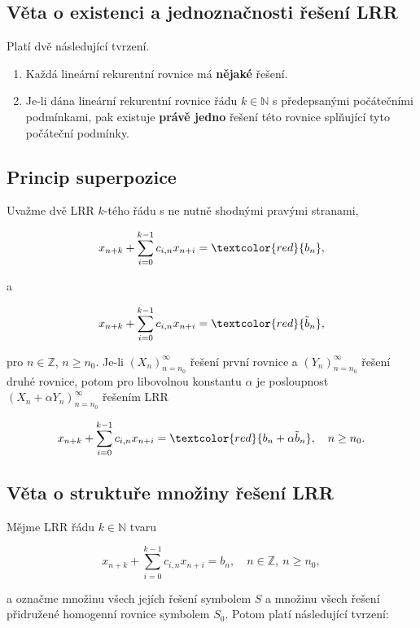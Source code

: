 \subsection*{Věta o existenci a jednoznačnosti řešení LRR}

Platí dvě následující tvrzení.

\begin{enumerate}
    \item Každá lineární rekurentní rovnice má \textbf{nějaké} řešení.
    \item  Je-li dána lineární rekurentní rovnice řádu $k \in \mathbb{N}$ s předepsanými
          počátečními podmínkami, pak existuje \textbf{právě jedno} řešení této rovnice
          splňující tyto počáteční podmínky.
\end{enumerate}

\subsection*{Princip superpozice}

Uvažme dvě LRR $k$-tého řádu s ne nutně shodnými pravými stranami,

\[ x_{n+k} + \sum_{i=0}^{k-1} c_{i,n} x_{n+i} = \textcolor{red}{b_n}, \]

\noindent a

\[ x_{n+k} + \sum_{i=0}^{k-1} c_{i,n} x_{n+i} = \textcolor{red}{\tilde{b}_n}, \]

\noindent pro $n \in \mathbb{Z}$, $n \geq n_0$. Je-li $(X_n)_{n = n_0}^\infty$ řešení první
rovnice a $(Y_n)_{n = n_0}^\infty$ řešení druhé rovnice, potom pro libovolnou
konstantu $\alpha$ je posloupnost $(X_n + \alpha Y_n)_{n = n_0}^\infty$ řešením
LRR

\[ x_{n+k} + \sum_{i=0}^{k-1} c_{i,n} x_{n+i} = \textcolor{red}{b_n + \alpha \tilde b_n}, \quad n \geq n_0. \]

\subsection*{Věta o struktuře množiny řešení LRR}

Mějme LRR řádu $k \in \mathbb{N}$ tvaru

\[ x_{n+k} + \sum_{i=0}^{k-1} c_{i,n} x_{n+i} = b_n, \quad n \in \mathbb{Z}, \ n \geq n_0, \]

\noindent a označme množinu všech jejích řešení symbolem $S$ a množinu všech řešení přidružené homogenní rovnice symbolem $S_0$.
Potom platí následující tvrzení:

